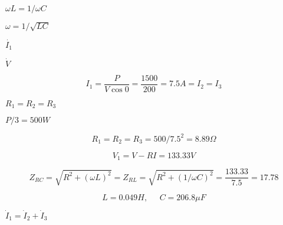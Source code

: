 {\newpage\clearpage
{}%
$\omega L=1/\omega C$%
\lthtmlinlinemathZ
\lthtmlcheckvsize\clearpage}

{\newpage\clearpage
{}%
$\omega=1/\sqrt{LC}$%
\lthtmlinlinemathZ
\lthtmlcheckvsize\clearpage}

{\newpage\clearpage
{}%
$\dot{I_1}$%
\lthtmlinlinemathZ
\lthtmlcheckvsize\clearpage}

{\newpage\clearpage
{}%
$\dot{V}$%
\lthtmlinlinemathZ
\lthtmlcheckvsize\clearpage}

{\newpage\clearpage
{}%
\begin{displaymath} I_1=\frac{P}{V \cos 0}=\frac{1500}{200}=7.5A =I_2=I_3 \end{displaymath}%
\lthtmldisplayZ
\lthtmlcheckvsize\clearpage}

{\newpage\clearpage
{}%
$R_1=R_2=R_3$%
\lthtmlinlinemathZ
\lthtmlcheckvsize\clearpage}

{\newpage\clearpage
{}%
$P/3=500W$%
\lthtmlinlinemathZ
\lthtmlcheckvsize\clearpage}

{\newpage\clearpage
{}%
\begin{displaymath} R_1=R_2=R_3=500/7.5^2=8.89\Omega \end{displaymath}%
\lthtmldisplayZ
\lthtmlcheckvsize\clearpage}

{\newpage\clearpage
{}%
\begin{displaymath} V_1=V-RI=133.33 V \end{displaymath}%
\lthtmldisplayZ
\lthtmlcheckvsize\clearpage}

{\newpage\clearpage
{}%
\begin{displaymath} Z_{RC}=\sqrt{R^2+(\omega L)^2}=Z_{RL}=\sqrt{R^2+(1/\omega C)^2}=\frac{133.33}{7.5}=17.78 \end{displaymath}%
\lthtmldisplayZ
\lthtmlcheckvsize\clearpage}

{\newpage\clearpage
{}%
\begin{displaymath} L=0.049H, \;\;\;\;\;C=206.8\mu F \end{displaymath}%
\lthtmldisplayZ
\lthtmlcheckvsize\clearpage}

{\newpage\clearpage
{}%
$\dot{I}_1=\dot{I}_2+\dot{I}_3$%
\lthtmlinlinemathZ
\lthtmlcheckvsize\clearpage}

